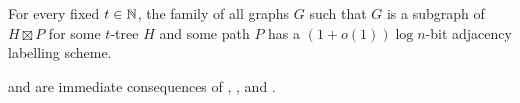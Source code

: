 \documentclass[kpfonts]{patmorin}
\let\le\leqslant
\begin{document}

\begin{thm}
  For every fixed $t\in\mathbb{N}$, the family of all graphs $G$ such that $G$ is a subgraph of $H\boxtimes P$ for some $t$-tree $H$ and some path $P$ has a $(1+o(1))\log n$-bit adjacency labelling scheme.
\end{thm}

 and  are immediate consequences of , , and .
\end{document}
